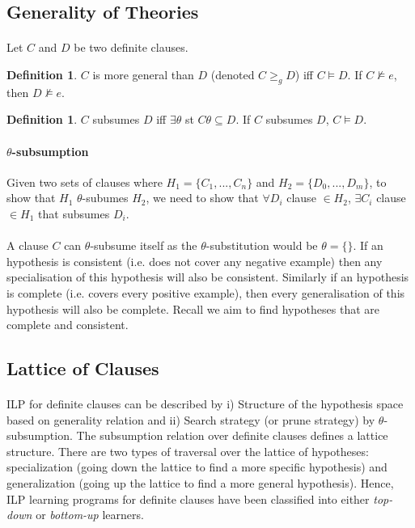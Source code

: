 \documentclass{article}
\theoremstyle{plain}
\theoremstyle{definition}
\newtheorem{defn}[thm]{Definition} %
\begin{document}
\begin{multicols}{2}
\subsection{Generality of Theories}

\paragraph{} Let $C$ and $D$ be two definite clauses. 

\begin{defn} $C$ is more general than $D$ (denoted $C \geq_g D$) iff $C \models D$. If $C \not\models e$, then $D \not\models e$. \end{defn}

\begin{defn} $C$ subsumes $D$ iff $\exists \theta$ st $C\theta \subseteq D$. If $C$ subsumes $D$, $C \models D$. \end{defn}

\paragraph{$\theta$-subsumption} Given two sets of clauses where $H_1 = \{C_1,... , C_n\}$ and $H_2 = \{D_0,... , D_m\}$, to show that $H_1$ $\theta$-subumes $H_2$, we need to show that $\forall D_i$ clause $\in H_2$, $\exists C_i$ clause $\in H_1$ that subsumes $D_i$.

\paragraph{} A clause $C$ can $\theta$-subsume itself as the $\theta$-substitution would be $\theta = \{\}$. If an hypothesis is consistent (i.e. does not cover any negative example) then any specialisation of this hypothesis will also be consistent. Similarly if an hypothesis is complete (i.e. covers every positive example), then every generalisation of this hypothesis will also be complete. Recall we aim to find hypotheses that are complete and consistent.

\subsection{Lattice of Clauses}

\paragraph{} ILP for definite clauses can be described by i) Structure of the hypothesis space based on generality relation and ii) Search strategy (or prune strategy) by $\theta$-subsumption. The subsumption relation over definite clauses defines a lattice structure. There are two types of traversal over the lattice of hypotheses: specialization (going down the lattice to find a more specific hypothesis) and generalization (going up the lattice to find a more general hypothesis). Hence, ILP learning programs for definite clauses have been classified into either \textit{top-down} or \textit{bottom-up} learners.


\end{multicols}
\end{document}
